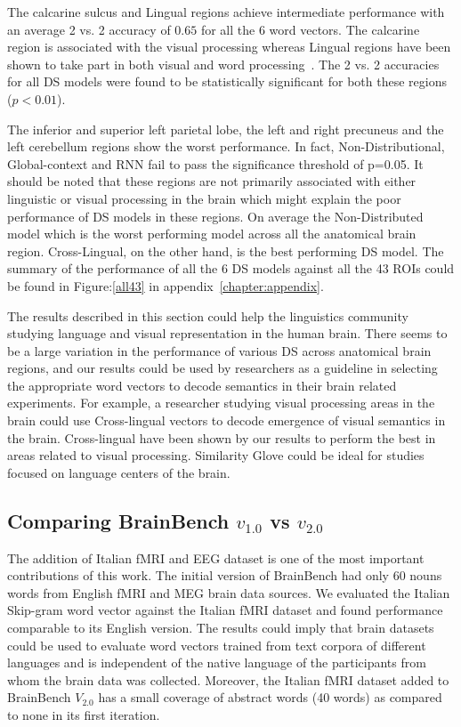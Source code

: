The calcarine sulcus and Lingual regions achieve intermediate performance with an average 2 vs. 2 accuracy of $0.65$ for all the 6 word vectors. The calcarine region is associated with the visual processing whereas Lingual regions have been shown to take part in both visual and word processing~\cite{andersonBrainEyes}. The 2 vs. 2 accuracies for all DS models were found to be statistically significant for both these regions ($p<0.01$).


The inferior and superior left parietal lobe, the left and right precuneus and the left cerebellum regions show the worst performance. In fact, Non-Distributional, Global-context and RNN fail to pass the significance threshold of p=0.05. It should be noted that these regions are not primarily associated with either linguistic or visual processing in the brain which might explain the poor performance of DS models in these regions. On average the Non-Distributed model which  is the worst performing model across all the anatomical brain region. Cross-Lingual, on the other hand, is the best performing DS model. The summary of the performance of all the 6 DS models against all the 43 ROIs could be found in Figure:\ref{all43} in appendix~\ref{chapter:appendix}.

The results described in this section could help the linguistics community studying language and visual representation in the human brain. There seems to be a large variation in the performance of various DS across anatomical brain regions, and our results could be used by researchers as a guideline in selecting the appropriate word vectors to decode semantics in their brain related experiments. For example, a researcher studying visual processing areas in the brain could use Cross-lingual vectors to decode emergence of visual semantics in the brain. Cross-lingual have been shown by our results to perform the best in areas related to visual processing. Similarity Glove could be ideal for studies focused on language centers of the brain.




\subsection{Comparing BrainBench $v_{1.0}$ vs $v_{2.0}$}

The addition of Italian fMRI and EEG dataset is one of the most important contributions of this work. The initial version of BrainBench had only 60 nouns words from English fMRI and MEG brain data sources. We evaluated the Italian Skip-gram word vector against the Italian fMRI dataset and found performance comparable to its English version. The results could imply that brain datasets could be used to evaluate word vectors trained from text corpora of different languages and is independent of the native language of the participants from whom the brain data was collected. Moreover, the Italian fMRI dataset added to BrainBench $V_{2.0}$ has a small coverage of abstract words (40 words) as compared to none in its first iteration.

